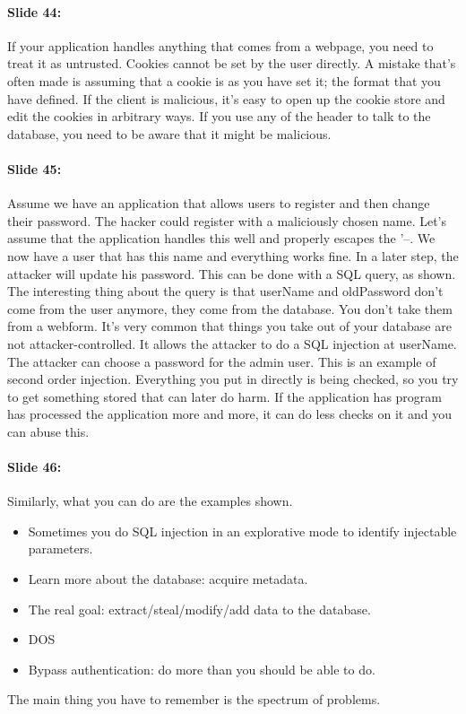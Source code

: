 \documentclass[10pt,a4paper]{report}
\begin{document}
\paragraph{Slide 44:} If your application handles anything that comes from a webpage, you need to treat it as untrusted. Cookies cannot be set by the user directly. A mistake that's often made is assuming that a cookie is as you have set it; the format that you have defined. If the client is malicious, it's easy to open up the cookie store and edit the cookies in arbitrary ways. If you use any of the header to talk to the database, you need to be aware that it might be malicious. 

\paragraph{Slide 45:} Assume we have an application that allows users to register and then change their password. The hacker could register with a maliciously chosen name. Let's assume that the application handles this well and properly escapes the '--. We now have a user that has this name and everything works fine. In a later step, the attacker will update his password. This can be done with a SQL query, as shown. The interesting thing about the query is that userName and oldPassword don't come from the user anymore, they come from the database. You don't take them from a webform. It's very common that things you take out of your database are not attacker-controlled. It allows the attacker to do a SQL injection at userName. The attacker can choose a password for the admin user. This is an example of second order injection. Everything you put in directly is being checked, so you try to get something stored that can later do harm. If the application has program has processed the application more and more, it can do less checks on it and you can abuse this.

\paragraph{Slide 46:} Similarly, what you can do are the examples shown. 
\begin{itemize}
\item Sometimes you do SQL injection in an explorative mode to identify injectable parameters. 
\item Learn more about the database: acquire metadata.
\item The real goal: extract/steal/modify/add data to the database.
\item DOS
\item Bypass authentication: do more than you should be able to do. 
\end{itemize}
The main thing you have to remember is the spectrum of problems.
\end{document}
